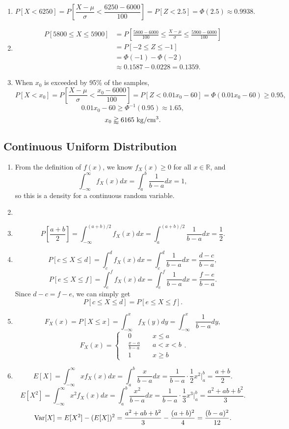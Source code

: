 \documentclass[11pt,a4paper]{article}
\begin{document}
\begin{enumerate}[label=\roman*)]
\item
$$P[X<6250]=P\left[\frac{X-\mu}{\sigma}<\frac{6250-6000}{100}\right]=P[Z<2.5]=\Phi(2.5)\approx0.9938.$$
\item
\begin{align*}
P[5800\leqslant X\leqslant 5900]&=P\left[\frac{5800-6000}{100}\leqslant\frac{X-\mu}{\sigma}\leqslant\frac{5900-6000}{100}\right]\\
&=P[-2\leqslant Z\leqslant -1]\\
&=\Phi(-1)-\Phi(-2)\\
&\approx0.1587-0.0228=0.1359.
\end{align*}
\item
When $x_0$ is exceeded by 95\% of the samples,
$$P[X<x_0]=P\left[\frac{X-\mu}{\sigma}<\frac{x_0-6000}{100}\right]=P[Z<0.01x_0-60]=\Phi(0.01x_0-60)\geqslant 0.95,$$
$$0.01x_0-60\geqslant\Phi^{-1}(0.95)\approx1.65,$$
$$x_0\gtrapprox6165{\rm~kg/cm^3}.$$
\end{enumerate}

\subsection{Continuous Uniform Distribution}

\begin{enumerate}[label=\roman*)]
\item
From the definition of $f(x)$, we know $f_X(x)\geqslant0$ for all $x\in\mathbb{R}$, and
$$\int_{-\infty}^\infty f_X(x)dx=\int_a^b\frac{1}{b-a}dx=1,$$
so this is a density for a continuous random variable.
\item

\item
$$P\left[\frac{a+b}{2}\right]=\int_{-\infty}^{(a+b)/2}f_X(x)dx=\int_a^{(a+b)/2}\frac{1}{b-a}dx=\frac{1}{2}.$$
\item
$$P[c\leqslant X\leqslant d]=\int_c^df_X(x)dx=\int_c^d\frac{1}{b-a}dx=\frac{d-c}{b-a},$$
$$P[e\leqslant X\leqslant f]=\int_e^ff_X(x)dx=\int_e^f\frac{1}{b-a}dx=\frac{f-e}{b-a}.$$
Since $d-c=f-e$, we can simply get
$$P[c\leqslant X\leqslant d]=P[e\leqslant X\leqslant f].$$
\item
$$F_X(x)=P[X\leqslant x]=\int_{-\infty}^xf_X(y)dy=\int_{-\infty}^x\frac{1}{b-a}dy,$$
$$F_X(x)=\left\{\begin{aligned}
&0&\quad x\leqslant a\\
&\frac{x-a}{b-a}&\quad a<x<b\\
&1&\quad x\geqslant b
\end{aligned}\right..$$
\item
$$E[X]=\int_{-\infty}^\infty xf_X(x)dx=\int_a^b\frac{x}{b-a}dx=\frac{1}{b-a}\cdot\frac{1}{2}x^2\bigg|_a^b=\frac{a+b}{2}.$$
$$E[X^2]=\int_{-\infty}^\infty x^2f_X(x)dx=\int_a^b\frac{x^2}{b-a}dx=\frac{1}{b-a}\cdot\frac{1}{3}x^3\bigg|_a^b=\frac{a^2+ab+b^2}{3}.$$
$${\rm Var}[X]=E[X^2]-(E[X])^2=\frac{a^2+ab+b^2}{3}-\frac{(a+b)^2}{4}=\frac{(b-a)^2}{12}.$$
\end{enumerate}
\end{document}

